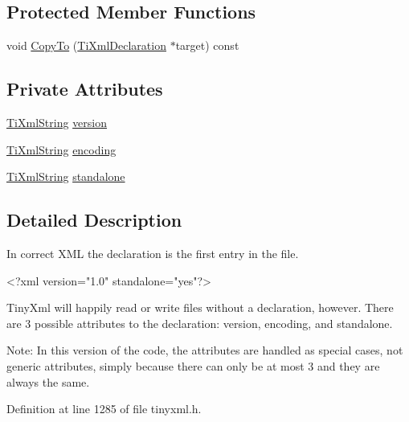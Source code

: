 \subsection*{Protected Member Functions}
\begin{DoxyCompactItemize}
\item 
void \hyperlink{class_ti_xml_declaration_a9d08959f935421a593032bd3efb30c38}{CopyTo} (\hyperlink{class_ti_xml_declaration}{TiXmlDeclaration} $\ast$target) const 
\end{DoxyCompactItemize}
\subsection*{Private Attributes}
\begin{DoxyCompactItemize}
\item 
\hyperlink{class_ti_xml_string}{TiXmlString} \hyperlink{class_ti_xml_declaration_a369b5e3c1a8d0cb1d62f69cdf02ead0f}{version}
\item 
\hyperlink{class_ti_xml_string}{TiXmlString} \hyperlink{class_ti_xml_declaration_a5eb346397dd758b4e9626fb68274d9d2}{encoding}
\item 
\hyperlink{class_ti_xml_string}{TiXmlString} \hyperlink{class_ti_xml_declaration_ae061e61062658a979f8cd8cca8807440}{standalone}
\end{DoxyCompactItemize}


\subsection{Detailed Description}
In correct XML the declaration is the first entry in the file. 

\begin{DoxyVerb}
		<?xml version="1.0" standalone="yes"?>
	\end{DoxyVerb}


TinyXml will happily read or write files without a declaration, however. There are 3 possible attributes to the declaration: version, encoding, and standalone.

Note: In this version of the code, the attributes are handled as special cases, not generic attributes, simply because there can only be at most 3 and they are always the same. 

Definition at line 1285 of file tinyxml.h.



